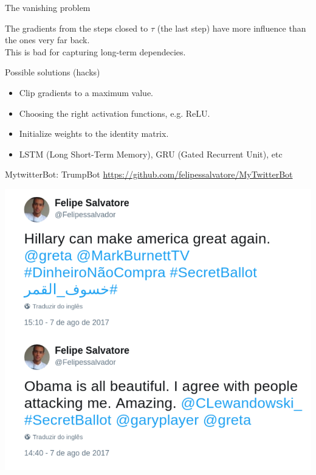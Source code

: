\documentclass[10pt]{beamer}
\begin{document}
\begin{frame}{The vanishing problem}

The gradients from the steps closed to $\tau$ (the last step) have more influence than the ones very far back.\\

This is bad for capturing \alert{long-term dependecies}.
\end{frame}

\begin{frame}{Possible solutions (hacks)}
\begin{itemize}
\item Clip gradients to a maximum value.
\vspace{0.4cm}
\item Choosing the right activation functions, e.g. ReLU.
\vspace{0.4cm}
\item Initialize weights to the identity matrix.
\vspace{0.4cm}
\item LSTM (Long Short-Term Memory), GRU (Gated Recurrent Unit), etc
\end{itemize}
\end{frame}

\begin{frame}{MytwitterBot: TrumpBot}
\url{https://github.com/felipessalvatore/MyTwitterBot}
\begin{center}
\includegraphics[scale=0.24]{images/TrumpBot.png}
\end{center}
\end{frame}
\end{document}
